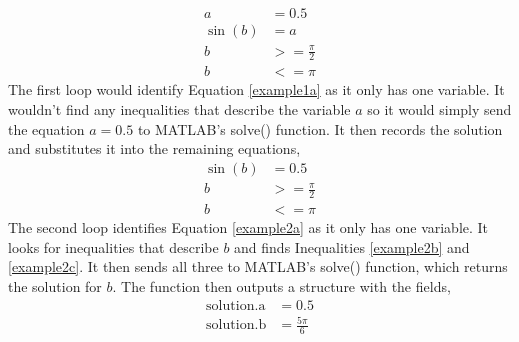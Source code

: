 \begin{subequations}
	\label{exampleinput}
	\begin{align}
		a &= 0.5 \label{example1a}\\
		\sin{(b)} &= a\\
		b &>= \frac{\pi}{2}\\
		b &<= \pi
	\end{align}
\end{subequations}
The first loop would identify Equation \ref{example1a} as it only has one variable. It wouldn't find any inequalities that describe the variable $a$ so it would simply send the equation $a = 0.5$ to MATLAB's solve() function. It then records the solution and substitutes it into the remaining equations, 
\begin{subequations}
	\label{example2}
	\begin{align}
		\sin{(b)} &= 0.5 \label{example2a}\\
		b &>= \frac{\pi}{2}\label{example2b}\\
		b &<= \pi\label{example2c}
	\end{align}
\end{subequations}
The second loop identifies Equation \ref{example2a} as it only has one variable. It looks for inequalities that describe $b$ and finds Inequalities \ref{example2b} and \ref{example2c}. It then sends all three to MATLAB's solve() function, which returns the solution for $b$.
The function then outputs a structure with the fields,
\begin{subequations}
	\begin{align}
		\mathrm{solution.a} &= 0.5\\
		\mathrm{solution.b} &= \frac{5\pi}{6}
	\end{align}
\end{subequations}

